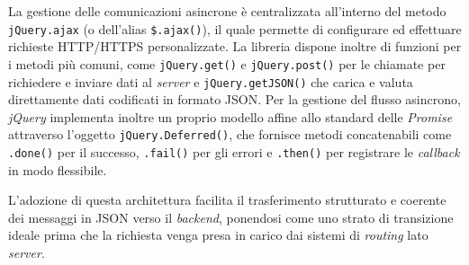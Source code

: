 La gestione delle comunicazioni asincrone è centralizzata all’interno del metodo \texttt{jQuery.ajax} (o dell'alias \texttt{\$.ajax()}), il quale permette di configurare ed effettuare richieste HTTP/HTTPS personalizzate. La libreria dispone inoltre di funzioni per i metodi più comuni, come \texttt{jQuery.get()} e \texttt{jQuery.post()} per le chiamate per richiedere e inviare dati al \textit{server} e \texttt{jQuery.getJSON()} che carica e valuta direttamente dati codificati in formato JSON.
Per la gestione del flusso asincrono, \textit{jQuery} implementa inoltre un proprio modello affine allo standard delle \textit{Promise} attraverso l’oggetto \texttt{jQuery.Deferred()}, che fornisce metodi concatenabili come \texttt{.done()} per il successo, \texttt{.fail()} per gli errori e \texttt{.then()} per registrare le \textit{callback} in modo flessibile. 

L’adozione di questa architettura facilita il trasferimento strutturato e coerente dei messaggi in JSON verso il \textit{backend}, ponendosi come uno strato di transizione ideale prima che la richiesta venga presa in carico dai sistemi di \textit{routing} lato \textit{server}.
